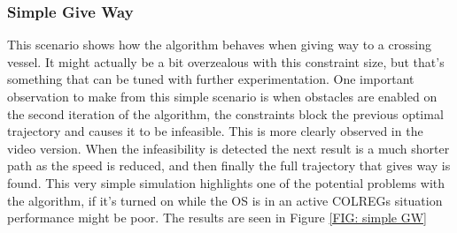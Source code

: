\subsubsection{Simple Give Way}
This scenario shows how the algorithm behaves when giving way to a crossing vessel. It might actually be a bit overzealous with this
constraint size, but that's something that can be tuned with further experimentation. One important observation to make from this
simple scenario is when obstacles are enabled on the second iteration of the algorithm, the constraints block the previous optimal
trajectory and causes it to be infeasible. This is more clearly observed in the video version. When the infeasibility is detected
the next result is a much shorter path as the speed is reduced, and then finally the full trajectory that gives way is found.
This very simple simulation highlights one of the potential problems with the algorithm, if it's turned on while the OS is in an active
COLREGs situation performance might be poor. The results are seen in Figure \ref{FIG: simple GW}

